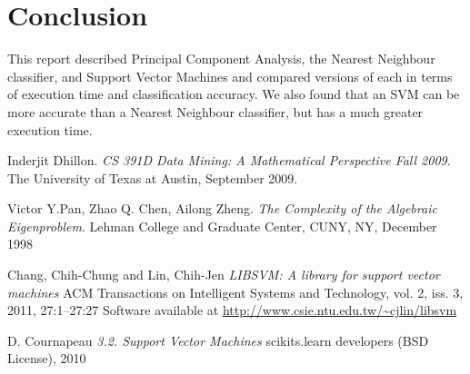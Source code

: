 \documentclass[10pt,twocolumn,letterpaper]{article}
\begin{document}
\section{Conclusion}
This report described Principal Component Analysis, the Nearest Neighbour classifier, and Support Vector Machines and compared versions of each in terms of execution time and classification accuracy. We also found that an SVM can be more accurate than a Nearest Neighbour classifier, but has a much greater execution time.
{\small


}

\begin{thebibliography}{9}
Inderjit Dhillon. 
\textit{CS 391D Data Mining: A Mathematical Perspective Fall 2009}. 
The University of Texas at Austin, September 2009.

Victor Y.Pan, Zhao Q. Chen, Ailong Zheng. 
\textit{The Complexity of the Algebraic Eigenproblem}. 
Lehman College and Graduate Center, CUNY, NY, December 1998

Chang, Chih-Chung and Lin, Chih-Jen
\textit{LIBSVM: A library for support vector machines}
ACM Transactions on Intelligent Systems and Technology, vol. 2, iss. 3, 2011, 27:1--27:27
Software available at \url{http://www.csie.ntu.edu.tw/~cjlin/libsvm}

D. Cournapeau
\textit{3.2. Support Vector Machines}
scikits.learn developers (BSD License), 2010

\end{thebibliography}
\end{document}
